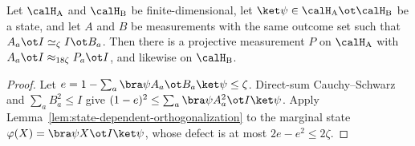 \begin{lemma}\label{lem:orthonormalization-main-lemma}
	\leanok
	Let $\calH_{\mathrm A}$ and $\calH_{\mathrm B}$ be finite-dimensional, let
	$\ket\psi\in\calH_{\mathrm A}\ot\calH_{\mathrm B}$ be a state, and let
	$A$ and $B$ be measurements with the same outcome set such that
	$A_a\ot I\simeq_\zeta I\ot B_a$.  Then there is a projective measurement
	$P$ on $\calH_{\mathrm A}$ with $A_a\ot I\approx_{18\zeta}P_a\ot I$, and
	likewise on $\calH_{\mathrm B}$.
\end{lemma}
\begin{proof}
	\leanok
	Let $e=1-\sum_a\bra\psi A_a\ot B_a\ket\psi\le\zeta$.  Direct-sum
	Cauchy--Schwarz and $\sum_aB_a^2\le I$ give
	$(1-e)^2\le\sum_a\bra\psi A_a^2\ot I\ket\psi$.  Apply
	Lemma~\ref{lem:state-dependent-orthogonalization} to the marginal state
	$\varphi(X)=\bra\psi X\ot I\ket\psi$, whose defect is at most
	$2e-e^2\le2\zeta$.
\end{proof}
